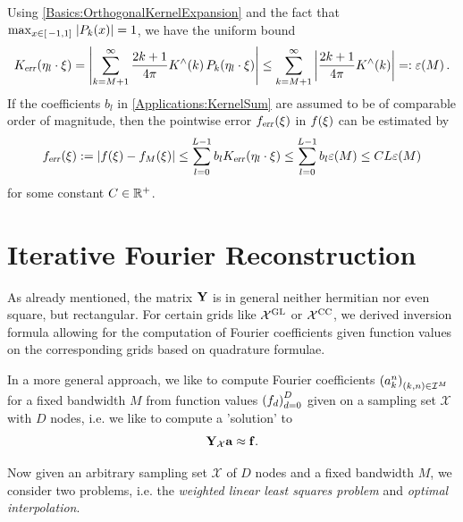 Using \eqref{Basics:OrthogonalKernelExpansion} and the fact that $\max_{x \in \left[\left.-1,1\right]\right.} \left\vert P_{k}{\hspace{-0.4ex}}\left(x\right)\right\vert = 1$, we have the uniform bound
\[
  K_{\text{\textsl{err}}}{\hspace{-0.4ex}}\left(\mathbf{\eta}_{l} \cdot \mathbf{\xi}\right) 
  = \left\vert\sum_{k = M+1}^{\infty} \frac{2k+1}{4\pi} K^{\wedge}{\hspace{-0.4ex}}\left(k\right) P_k{\hspace{-0.4ex}}\left(\mathbf{\eta}_{l} \cdot \mathbf{\xi}\right)\right\vert 
  \le \sum_{k = M+1}^{\infty} \left\vert\frac{2k+1}{4\pi} K^{\wedge}{\hspace{-0.4ex}}\left(k\right)\right\vert =: \varepsilon{\hspace{-0.4ex}}\left(M\right).
\]
If the coefficients $b_{l}$ in \eqref{Applications:KernelSum} are assumed to be of comparable order of magnitude, then the pointwise error $f_{\text{\textsl{err}}}{\hspace{-0.4ex}}\left(\xi\right)$ in $f{\hspace{-0.4ex}}\left(\mathbf{\xi}\right)$ can be estimated by
\[
  f_{\text{\textsl{err}}}{\hspace{-0.4ex}}\left(\xi\right) := \left\vert f{\hspace{-0.4ex}}\left(\xi\right) - f_{M}{\hspace{-0.4ex}}\left(\xi\right)\right\vert 
  \le \sum_{l=0}^{L-1} b_{l} K_{\text{\textsl{err}}}{\hspace{-0.4ex}}\left(\mathbf{\eta}_{l} \cdot \mathbf{\xi}\right)
  \le \sum_{l=0}^{L-1} b_{l} \varepsilon{\hspace{-0.4ex}}\left(M\right)
  \le C L \varepsilon{\hspace{-0.4ex}}\left(M\right)
\]
for some constant $C \in \mathbb{R}^{+}$.

\section{Iterative Fourier Reconstruction}

As already mentioned, the matrix $\mathbf{Y}$ is in general neither hermitian nor 
even square, but rectangular. For certain grids like $\mathcal{X^{\mbox{\scriptsize\rm{GL}}}}$ or 
$\mathcal{X^{\mbox{\scriptsize\rm{CC}}}}$, we derived inversion formula allowing for the computation 
of Fourier coefficients given function values on the corresponding grids 
based on quadrature formulae. 

In a more general approach, we like to compute Fourier coefficients 
$\left(a_{k}^n\right)_{(k,n) \in \mathcal{I}^M}$ for a fixed bandwidth $M$
from function values $\left(f_{d}\right)_{d=0}^D$ given on a sampling set
$\mathcal{X}$ with $D$ nodes, i.e. we like to compute a 'solution' to
\begin{equation}
  \label{Applications:Problem}
  \mathbf{Y}_{\mathcal{X}} \mathbf{a} \approx \mathbf{f}.
\end{equation}

Now given an arbitrary sampling set $\mathcal{X}$ of $D$ nodes and a fixed 
bandwidth $M$, we consider two problems, i.e. the \emph{weighted linear 
least squares problem} and \emph{optimal interpolation}.

